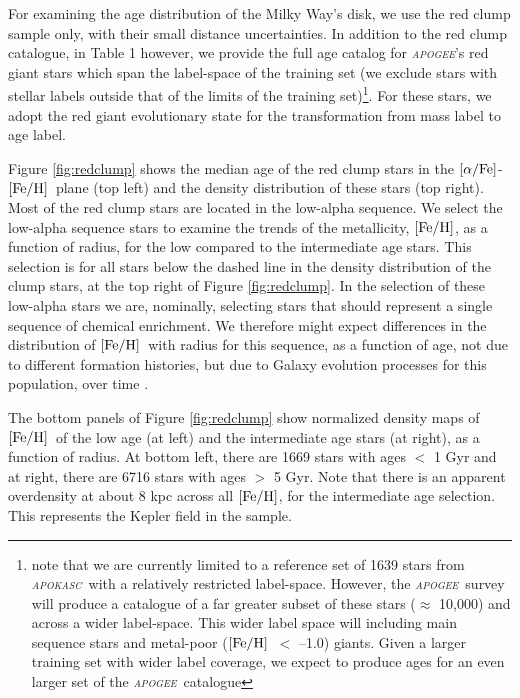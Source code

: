 \documentclass[12pt, preprint]{aastex}
\newcommand{\project}[1]{\textsl{#1}}
\newcommand{\apogee}{\project{\textsc{apogee}}}
\newcommand{\apokasc}{\project{\textsc{apokasc}}}
\newcommand{\feh}{\mbox{$\rm [Fe/H]$}}
\newcommand{\alphafe}{\mbox{$\rm [\alpha/Fe]$}}
\begin{document}
For examining the age distribution of the Milky Way's disk, we use the red clump sample only, with their small distance uncertainties. In addition to the red clump catalogue, in Table 1 however, we provide the full age catalog for \apogee's red giant stars which span the label-space of the training set (we exclude stars with stellar labels outside that of the limits of the training set)\footnote{note that we are currently limited to a reference set of 1639 stars from \apokasc\ with a relatively restricted label-space. However, the \apogee\ survey will produce a catalogue of a far greater subset of these stars ($\approx$ 10,000) and across a wider label-space. This wider label space will including main sequence stars and metal-poor (\feh\ $<$ --1.0) giants. Given a larger training set with wider label coverage, we expect to produce ages for an even larger set of the \apogee\ catalogue}. For these stars, we adopt the red giant evolutionary state for the transformation from mass label to age label. 


Figure \ref{fig:redclump} shows the median age of the red clump stars in the \alphafe-\feh\ plane (top left) and the density distribution of these stars (top right).  Most of the red clump stars are located in the low-alpha sequence. We select the low-alpha sequence stars to examine the trends of the metallicity, \feh, as a function of radius, for the low compared to the intermediate age stars. This selection is for all stars below the dashed line in the density distribution of the clump stars, at the top right of Figure \ref{fig:redclump}. In the selection of these low-alpha stars we are, nominally, selecting stars that should represent a single sequence of chemical enrichment. We therefore might expect differences in the distribution of \feh\ with radius for this sequence, as a function of age, not due to different formation histories, but due to Galaxy evolution processes for this population, over time \citep[e.g.][]{Roskar2008, Schonrich2009}. 

The bottom panels of Figure \ref{fig:redclump} show normalized density maps of \feh\ of the low age (at left) and the intermediate age stars (at right), as a function of radius. At bottom left, there are 1669 stars with ages $<$ 1 Gyr and at right, there are 6716 stars with ages $>$ 5 Gyr. Note that there is an apparent overdensity at about 8 kpc across all \feh, for the intermediate age selection. This represents the Kepler field in the sample.
\end{document}
